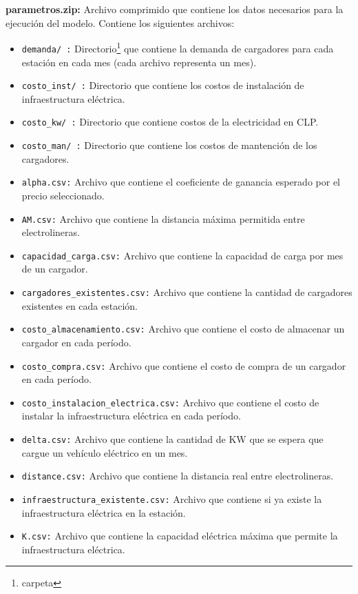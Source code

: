 \documentclass[letterpaper]{article}
\begin{document}
\begin{flushleft}
	\textbf{parametros.zip:} Archivo comprimido que contiene los datos necesarios para la ejecución del modelo. Contiene los siguientes archivos:

	\begin{itemize}
		\item \texttt{demanda/ :} Directorio\footnote{carpeta} que contiene la demanda de cargadores para cada estación en cada mes (cada archivo representa un mes).
		\item \texttt{costo\_inst/ :} Directorio que contiene los costos de instalación de infraestructura eléctrica.
		\item \texttt{costo\_kw/ :} Directorio que contiene costos de la electricidad en CLP.
		\item \texttt{costo\_man/ :} Directorio que contiene los costos de mantención de los cargadores.
		\item \texttt{alpha.csv:} Archivo que contiene el coeficiente de ganancia esperado por el precio seleccionado.
		\item \texttt{AM.csv:} Archivo que contiene la distancia máxima permitida entre electrolineras.
		\item \texttt{capacidad\_carga.csv:} Archivo que contiene la capacidad de carga por mes de un cargador.
		\item \texttt{cargadores\_existentes.csv:} Archivo que contiene la cantidad de cargadores existentes en cada estación.
		\item \texttt{costo\_almacenamiento.csv:} Archivo que contiene el costo de almacenar un cargador en cada período.
		\item \texttt{costo\_compra.csv:} Archivo que contiene el costo de compra de un cargador en cada período.
		\item \texttt{costo\_instalacion\_electrica.csv:} Archivo que contiene el costo de instalar la infraestructura eléctrica en cada período.
		\item \texttt{delta.csv:} Archivo que contiene la cantidad de KW que se espera que cargue un vehículo eléctrico en un mes.
		\item \texttt{distance.csv:} Archivo que contiene la distancia real entre electrolineras.
		\item \texttt{infraestructura\_existente.csv:} Archivo que contiene si ya existe la infraestructura eléctrica en la estación.
		\item \texttt{K.csv:} Archivo que contiene la capacidad eléctrica máxima que permite la infraestructura eléctrica.
	\end{itemize}


\end{flushleft}
\end{document}
